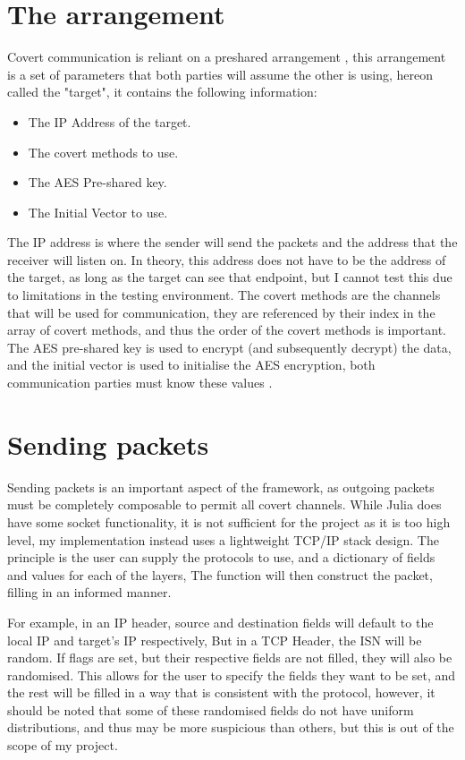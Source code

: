 \section{The arrangement}
\label{sec:target}

Covert communication is reliant on a preshared arrangement \citep{DoCCaS}, this arrangement is a set of parameters that both parties will assume the other is using, hereon called the "target", it contains the following information:

\begin{itemize}
    \item The IP Address of the target.
    \item The covert methods to use.
    \item The AES Pre-shared key.
    \item The Initial Vector to use.
\end{itemize}

The IP address is where the sender will send the packets and the address that the receiver will listen on. In theory, this address does not have to be the address of the target, as long as the target can see that endpoint, but I cannot test this due to limitations in the testing environment. The covert methods are the channels that will be used for communication, they are referenced by their index in the array of covert methods, and thus the order of the covert methods is important.
The AES pre-shared key is used to encrypt (and subsequently decrypt) the data, and the initial vector is used to initialise the AES encryption, both communication parties must know these values \citep{GUCCA}.

\section{Sending packets}
\label{sec:sending_packets}

Sending packets is an important aspect of the framework, as outgoing packets must be completely composable to permit all covert channels. While Julia does have some socket functionality, it is not sufficient for the project as it is too high level, my implementation instead uses a lightweight TCP/IP stack design. The principle is the user can supply the protocols to use, and a dictionary of fields and values for each of the layers, The function will then construct the packet, filling in an informed manner.

For example, in an IP header, source and destination fields will default to the local IP and target's IP respectively, But in a TCP Header, the ISN will be random. If flags are set, but their respective fields are not filled, they will also be randomised. This allows for the user to specify the fields they want to be set, and the rest will be filled in a way that is consistent with the protocol, however, it should be noted that some of these randomised fields do not have uniform distributions, and thus may be more suspicious than others, but this is out of the scope of my project.
 
